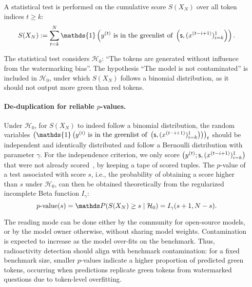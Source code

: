A statistical test is performed on the cumulative score $S(X_N)$ over all token indices $t\geq k$:
\begin{equation}
\label{eq:def_S_N}
    S(X_N) := \sum_{t=k}^N \mathds{1} \left( y^{(t)} \text{ is in the greenlist of } \left( \sk, (x^{(t-i+1)})_{i=k}^1 \right) \right).
\end{equation}


The statistical test considers $\mathcal{H}_0$: ``The tokens are generated without influence from the watermarking bias''.
The hypothesis ``The model is not contaminated'' is included in $\mathcal{H}_0$, under which $S(X_N)$ follows a binomial distribution, as it should not output more green than red tokens.


\paragraph{\textbf{De-duplication for reliable $p$-values.}}
Under $\mathcal{H}_0$, for $S(X_N)$ to indeed follow a binomial distribution, the random variables $\left(\mathds{1} \left( y^{(t)} \text{ is in the greenlist of } \left( \sk, (x^{(t-i+1)})_{i=k}^1 \right) \right) \right)_t$ should be independent and identically distributed and follow a Bernoulli distribution with parameter $\gamma$.
For the independence criterion, we only score $\left(y^{(t)} ; \mathsf{s}, (x^{(t-i+1)})_{i=k}^1\right)$ that were not already scored~\citep{kirchenbauer2023watermark,fernandez2023three,sander2024watermarking}, by keeping a tape of scored tuples.
The $p$-value of a test associated with score $s$, i.e., the probability of obtaining a score higher than $s$ under $\mathcal{H}_0$, can then be obtained theoretically from the regularized incomplete Beta function $I_{\gamma}$:
\begin{equation}
    \text{$p$-value}(s) = \Prob(S(X_N) \geq s \mid \mathcal{H}_0) = I_{\gamma}(s+1, N-s).
\end{equation}


The reading mode can be done either by the community for open-source models, or by the model owner otherwise, without sharing model weights.
Contamination is expected to increase as the model over-fits on the benchmark. 
Thus, radioactivity detection should align with benchmark contamination: for a fixed benchmark size, smaller $p$-values indicate a higher proportion of predicted green tokens, occurring when predictions replicate green tokens from watermarked questions due to token-level overfitting.




